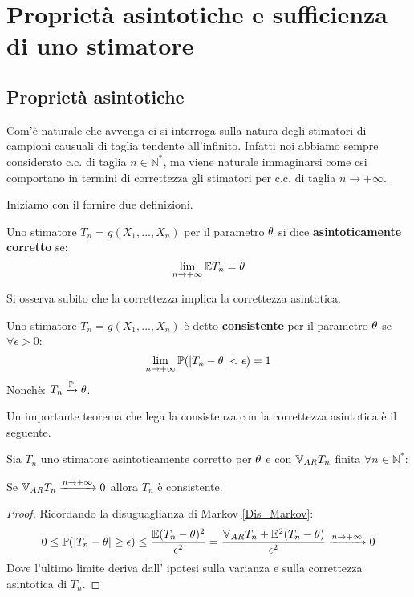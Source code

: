 \section{Proprietà asintotiche e sufficienza di uno stimatore}
\subsection{Proprietà asintotiche}
Com'è naturale che avvenga ci si interroga sulla natura degli stimatori di campioni causuali di taglia tendente all'infinito. Infatti noi abbiamo sempre considerato c.c. di taglia $n\in\mathbb{N}^*$, ma viene naturale immaginarsi come csi comportano in termini di correttezza gli stimatori per c.c. di taglia $n\longrightarrow+\infty$. 

Iniziamo con il fornire due definizioni.

\vspace{5px}

\begin{definition}
Uno stimatore $T_n=g(X_1,...,X_n)$ per il parametro $\theta$ si dice \textbf{asintoticamente corretto} se:
\[\lim_{n\to+\infty}\mathbb{E} T_n=\theta\]
\end{definition}

\vspace{5px}

Si osserva subito che la correttezza implica la correttezza asintotica. 

\begin{definition}
Uno stimatore $T_n=g(X_1,...,X_n)$ è detto \textbf{consistente} per il parametro $\theta$ se $\forall\epsilon>0$:
\[\lim_{n\to+\infty}\mathbb{P}(|T_n-\theta|<\epsilon)=1\]
Nonchè: $T_n\xrightarrow{\mathbb{P}}\theta$.
\end{definition}

\vspace{10px}

Un importante teorema che lega la consistenza con la correttezza asintotica è il seguente.

\begin{theorem}
Sia $T_n$ uno stimatore asintoticamente corretto per $\theta$ e con $\mathbb{V}_{AR} T_n$ finita $\forall n\in\mathbb{N}^*$:
\begin{center}
    Se $\mathbb{V}_{AR} T_n\xrightarrow{n\to+\infty}0$ allora $T_n$ è consistente.
\end{center}
\begin{proof}
Ricordando la disuguaglianza di Markov \ref{Dis_Markov}:
\[0\leq \mathbb{P}(|T_n-\theta|\geq\epsilon)\leq \frac{\mathbb{E}(T_n-\theta)^2}{\epsilon^2}=\frac{\mathbb{V}_{AR} T_n + \mathbb{E}^2(T_n-\theta)}{\epsilon^2}\xrightarrow{n\to+\infty}0\]
Dove l'ultimo limite deriva dall' ipotesi sulla varianza e sulla correttezza asintotica di $T_n$.
\end{proof}
\end{theorem}


